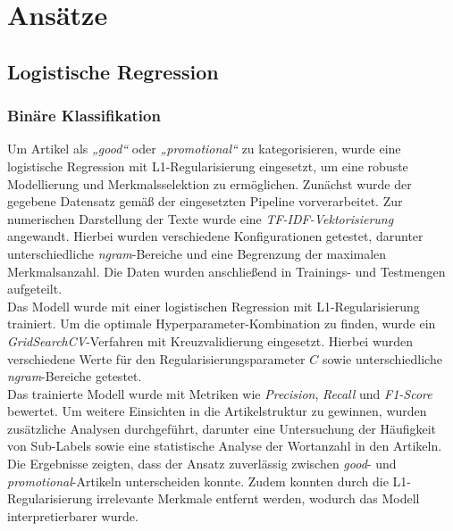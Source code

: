 \documentclass[researchlab,palatino]{AIGpaper}
\begin{document}
\section{Ansätze}
\subsection{Logistische Regression}
\subsubsection{Binäre Klassifikation}
Um Artikel als \textit{„good“} oder \textit{„promotional“} zu kategorisieren, wurde eine logistische Regression mit L1-Regularisierung eingesetzt, um eine robuste Modellierung und Merkmalsselektion zu ermöglichen. Zunächst wurde der gegebene Datensatz gemäß der eingesetzten Pipeline vorverarbeitet. Zur numerischen Darstellung der Texte wurde eine \textit{TF-IDF-Vektorisierung} angewandt. Hierbei wurden verschiedene Konfigurationen getestet, darunter unterschiedliche \textit{ngram}-Bereiche und eine Begrenzung der maximalen Merkmalsanzahl. Die Daten wurden anschließend in Trainings- und Testmengen aufgeteilt.\\
Das Modell wurde mit einer logistischen Regression mit L1-Regularisierung trainiert. Um die optimale Hyperparameter-Kombination zu finden, wurde ein \textit{GridSearchCV}-Verfahren mit Kreuzvalidierung eingesetzt. Hierbei wurden verschiedene Werte für den Regularisierungsparameter \(C\) sowie unterschiedliche \textit{ngram}-Bereiche getestet. \\
Das trainierte Modell wurde mit Metriken wie \textit{Precision}, \textit{Recall} und \textit{F1-Score} bewertet. Um weitere Einsichten in die Artikelstruktur zu gewinnen, wurden zusätzliche Analysen durchgeführt, darunter eine Untersuchung der Häufigkeit von Sub-Labels sowie eine statistische Analyse der Wortanzahl in den Artikeln.\\
Die Ergebnisse zeigten, dass der Ansatz zuverlässig zwischen \textit{good}- und \textit{promotional}-Artikeln unterscheiden konnte. Zudem konnten durch die L1-Regularisierung irrelevante Merkmale entfernt werden, wodurch das Modell interpretierbarer wurde.
\end{document}
